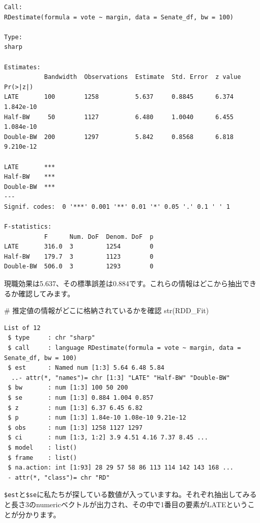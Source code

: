 \documentclass[
  a4paper,
  pandoc,
  ja=standard,
  jafont=haranoaji]{bxjsbook}
\newenvironment{Shaded}{\begin{snugshade}}{\end{snugshade}}
\newcommand{\CommentTok}[1]{\textcolor[rgb]{0.37,0.37,0.37}{#1}}
\newcommand{\FunctionTok}[1]{\textcolor[rgb]{0.28,0.35,0.67}{#1}}
\newcommand{\NormalTok}[1]{\textcolor[rgb]{0.00,0.48,0.65}{#1}}
\newcommand{\SpecialCharTok}[1]{\textcolor[rgb]{0.37,0.37,0.37}{#1}}
\begin{document}
\begin{verbatim}
Call:
RDestimate(formula = vote ~ margin, data = Senate_df, bw = 100)

Type:
sharp 

Estimates:
           Bandwidth  Observations  Estimate  Std. Error  z value  Pr(>|z|) 
LATE       100        1258          5.637     0.8845      6.374    1.842e-10
Half-BW     50        1127          6.480     1.0040      6.455    1.084e-10
Double-BW  200        1297          5.842     0.8568      6.818    9.210e-12
              
LATE       ***
Half-BW    ***
Double-BW  ***
---
Signif. codes:  0 '***' 0.001 '**' 0.01 '*' 0.05 '.' 0.1 ' ' 1

F-statistics:
           F      Num. DoF  Denom. DoF  p
LATE       316.0  3         1254        0
Half-BW    179.7  3         1123        0
Double-BW  506.0  3         1293        0
\end{verbatim}

現職効果は5.637、その標準誤差は0.884です。これらの情報はどこから抽出できるか確認してみます。

\begin{Shaded}
\begin{Highlighting}[numbers=left,,]
\CommentTok{\# 推定値の情報がどこに格納されているかを確認}
\FunctionTok{str}\NormalTok{(RDD\_Fit)}
\end{Highlighting}
\end{Shaded}

\begin{verbatim}
List of 12
 $ type     : chr "sharp"
 $ call     : language RDestimate(formula = vote ~ margin, data = Senate_df, bw = 100)
 $ est      : Named num [1:3] 5.64 6.48 5.84
  ..- attr(*, "names")= chr [1:3] "LATE" "Half-BW" "Double-BW"
 $ bw       : num [1:3] 100 50 200
 $ se       : num [1:3] 0.884 1.004 0.857
 $ z        : num [1:3] 6.37 6.45 6.82
 $ p        : num [1:3] 1.84e-10 1.08e-10 9.21e-12
 $ obs      : num [1:3] 1258 1127 1297
 $ ci       : num [1:3, 1:2] 3.9 4.51 4.16 7.37 8.45 ...
 $ model    : list()
 $ frame    : list()
 $ na.action: int [1:93] 28 29 57 58 86 113 114 142 143 168 ...
 - attr(*, "class")= chr "RD"
\end{verbatim}

\texttt{\$est}と\texttt{\$se}に私たちが探している数値が入っていますね。それぞれ抽出してみると長さ3のnumericベクトルが出力され、その中で1番目の要素がLATEということが分かります。

\begin{Shaded}
\end{Shaded}
\end{document}
